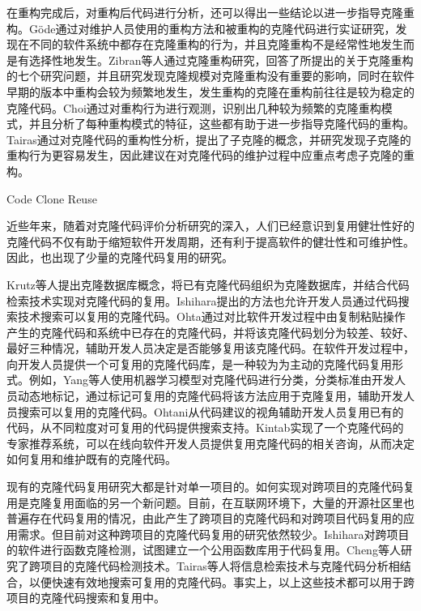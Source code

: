 在重构完成后，对重构后代码进行分析，还可以得出一些结论以进一步指导克隆重构\cite{gode2010clone}\cite{zibran2013evaluating}\cite{eunjong2014investigation}\cite{eunjong2014investigation}。G{\"o}de通过对维护人员使用的重构方法和被重构的克隆代码进行实证研究，发现在不同的软件系统中都存在克隆重构的行为，并且克隆重构不是经常性地发生而是有选择性地发生\cite{gode2010clone}。Zibran等人通过克隆重构研究，回答了所提出的关于克隆重构的七个研究问题，并且研究发现克隆规模对克隆重构没有重要的影响，同时在软件早期的版本中重构会较为频繁地发生，发生重构的克隆在重构前往往是较为稳定的克隆代码\cite{zibran2013evaluating}。Choi通过对重构行为进行观测，识别出几种较为频繁的克隆重构模式，并且分析了每种重构模式的特征，这些都有助于进一步指导克隆代码的重构\cite{eunjong2014investigation}。Tairas通过对克隆代码的重构性分析，提出了子克隆的概念，并研究发现子克隆的重构行为更容易发生，因此建议在对克隆代码的维护过程中应重点考虑子克隆的重构\cite{tairas2010sub}。

{Code Clone Reuse}

近些年来，随着对克隆代码评价分析研究的深入，人们已经意识到复用健壮性好的克隆代码不仅有助于缩短软件开发周期，还有利于提高软件的健壮性和可维护性。因此，也出现了少量的克隆代码复用的研究。

Krutz等人提出克隆数据库概念，将已有克隆代码组织为克隆数据库，并结合代码检索技术实现对克隆代码的复用\cite{krutz2014code}。Ishihara提出的方法也允许开发人员通过代码搜索技术搜索可以复用的克隆代码\cite{ishihara2013reusing}。Ohta通过对比软件开发过程中由复制粘贴操作产生的克隆代码和系统中已存在的克隆代码，并将该克隆代码划分为较差、较好、最好三种情况，辅助开发人员决定是否能够复用该克隆代码\cite{ohta2015source}。在软件开发过程中，向开发人员提供一个可复用的克隆代码库，是一种较为为主动的克隆代码复用形式。例如，Yang\cite{yang2015classification}等人使用机器学习模型对克隆代码进行分类，分类标准由开发人员动态地标记，通过标记可复用的克隆代码将该方法应用于克隆复用，辅助开发人员搜索可以复用的克隆代码。Ohtani从代码建议的视角辅助开发人员复用已有的代码，从不同粒度对可复用的代码提供搜索支持\cite{ohtani2015level}。Kintab实现了一个克隆代码的专家推荐系统，可以在线向软件开发人员提供复用克隆代码的相关咨询，从而决定如何复用和维护既有的克隆代码\cite{kintab2014recommending}。

现有的克隆代码复用研究大都是针对单一项目的。如何实现对跨项目的克隆代码复用是克隆复用面临的另一个新问题。目前，在互联网环境下，大量的开源社区里也普遍存在代码复用的情况，由此产生了跨项目的克隆代码和对跨项目代码复用的应用需求。但目前对这种跨项目的克隆代码复用的研究依然较少。Ishihara对跨项目的软件进行函数克隆检测，试图建立一个公用函数库用于代码复用\cite{ishihara2012inter}。Cheng等人研究了跨项目的克隆代码检测技术\cite{cheng2016feasibility}。Tairas等人将信息检索技术与克隆代码分析相结合，以便快速有效地搜索可复用的克隆代码\cite{tairas2009information}。事实上，以上这些技术都可以用于跨项目的克隆代码搜索和复用中。

